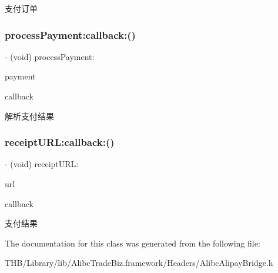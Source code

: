 支付订单 \mbox{\label{interface_alibc_alipay_bridge_ab68b0aaa81801cd073f23a1ff72fabda}} 
\subsubsection{\texorpdfstring{process\+Payment\+:callback\+:()}{processPayment:callback:()}}
{\footnotesize\ttfamily -\/ (void) process\+Payment\+: \begin{DoxyParamCaption}\item[{(N\+S\+Dictionary $\ast$\+\_\+\+\_\+nullable)}]{payment }\item[{callback:(nullable void($^\wedge$)(\mbox{\hyperlink{interface_alibc_trade_pay_result}{Alibc\+Trade\+Pay\+Result}} $\ast$\+\_\+\+\_\+nullable result, N\+S\+Error $\ast$\+\_\+\+\_\+nullable error))}]{callback }\end{DoxyParamCaption}}

解析支付结果 \mbox{\label{interface_alibc_alipay_bridge_a756c20159c33976347ab4d48cabae60f}} 
\subsubsection{\texorpdfstring{receipt\+U\+R\+L\+:callback\+:()}{receiptURL:callback:()}}
{\footnotesize\ttfamily -\/ (void) receipt\+U\+R\+L\+: \begin{DoxyParamCaption}\item[{(nullable N\+S\+U\+RL $\ast$)}]{url }\item[{callback:(nullable void($^\wedge$)(N\+S\+Dictionary $\ast$\+\_\+\+\_\+nullable result))}]{callback }\end{DoxyParamCaption}}

支付结果 

The documentation for this class was generated from the following file\+:\begin{DoxyCompactItemize}
\item 
T\+H\+B/\+Library/lib/\+Alibc\+Trade\+Biz.\+framework/\+Headers/Alibc\+Alipay\+Bridge.\+h\end{DoxyCompactItemize}
